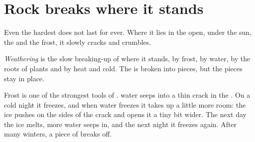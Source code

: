 \section{Rock breaks where it stands}

Even the hardest  does not last for ever. Where it lies in the open,
under the sun, the  and the frost, it slowly cracks and crumbles.

\begin{definition}[Weathering]\label{def:g5:water-shapes-the-land:weathering}
\emph{Weathering} is the slow breaking-up of  where it
stands, by frost, by water, by the roots of plants and by heat and cold.
The  is broken into pieces, but the pieces stay in place.
\end{definition}

Frost is one of the strongest tools of .  water seeps into a
thin crack in the . On a cold night it freezes, and when water freezes
it takes up a little more room: the ice pushes on the sides of the crack
and opens it a tiny bit wider. The next day the ice melts, more water seeps
in, and the next night it freezes again. After many winters, a piece of
 breaks off.

